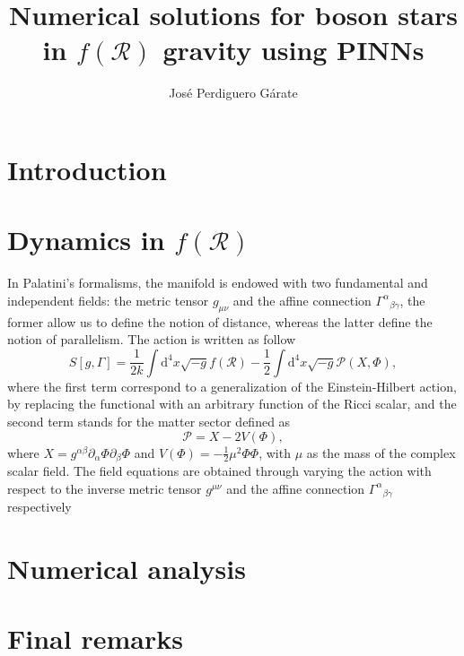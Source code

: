 \documentclass{article}
\title{Numerical solutions for boson stars in $f\left(\mathcal{R}\right)$ gravity using PINNs}
\author{Jos\'e Perdiguero G\'arate}
\begin{document}
\maketitle

\section{Introduction}
\label{sec:introduction}

\section{Dynamics in $f\left(\mathcal{R}\right)$}
\label{sec:dynamics}

In Palatini's formalisms, the manifold is endowed with two fundamental and independent
fields: the metric tensor $g_{\mu\nu}$ and the affine connection $\Gamma^{\alpha}{}_{\beta\gamma}$, 
the former allow us to define the notion of distance, whereas the latter define the notion of 
parallelism. The action is written as follow
\begin{equation}
S\left[g, \Gamma\right] = \frac{1}{2k}\int \mathrm{d}^{4}x \sqrt{-g}f\left(\mathcal{R}\right) 
    - \frac{1}{2}\int \mathrm{d}^{4}x \sqrt{-g}\mathcal{P}(X, \Phi),
\end{equation}
where the first term correspond to a generalization of the Einstein-Hilbert action, by replacing
the functional with an arbitrary function of the Ricci scalar, and the second term stands for the
matter sector defined as
\begin{equation}
\mathcal{P}  = X - 2V(\Phi),
\end{equation}
where $X = g^{\alpha\beta}\partial_\alpha {\Phi} \partial_\beta \Phi$ and $V(\Phi) = -\frac{1}{2}\mu^2\Phi\Phi$,
with $\mu$ as the mass of the complex scalar field. The field equations are obtained through varying
the action with respect to the inverse metric tensor $g^{\mu\nu}$ and the affine connection
$\Gamma^{\alpha}{}_{\beta\gamma}$ respectively


\section{Numerical analysis}
\label{sec:numercal_analysis}

\section{Final remarks}
\label{sec:remarks}
\end{document}
